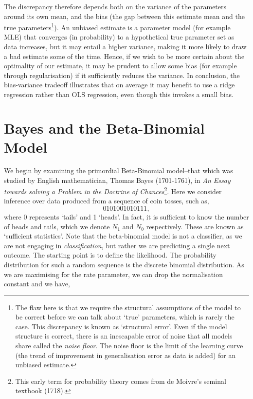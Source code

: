 \documentclass[11pt]{amsart}
\begin{document}
The discrepancy therefore depends both on the variance of the parameters around its own mean, and the bias (the gap between this estimate mean and the true parameters\footnote{The flaw here is that we require the structural assumptions of the model to be correct before we can talk about `true' parameters, which is rarely the case. This discrepancy is known as `structural error'. Even if the model structure is correct, there is an inescapable error of noise that all models share called the \emph{noise floor}. The noise floor is the limit of the learning curve (the trend of improvement in generalisation error as data is added) for an unbiased estimate.}). An unbiased estimate is a parameter model (for example MLE) that converges (in probability) to a hypothetical true parameter set as data increases, but it may entail a higher variance, making it more likely to draw a bad estimate some of the time. Hence, if we wish to be more certain about the optimality of our estimate, it may be prudent to allow some bias (for example through regularisation) if it sufficiently reduces the variance. In conclusion, the bias-variance tradeoff illustrates that on average it may benefit to use a ridge regression rather than OLS regression, even though this invokes a small bias.

\section{Bayes and the Beta-Binomial Model}

We begin by examining the primordial Beta-Binomial model--that which was studied by English mathematician, Thomas Bayes (1701-1761), in \emph{An Essay towards solving a Problem in the Doctrine of Chances}\footnote{This early term for probability theory comes from de Moivre's seminal textbook (1718).}. Here we consider inference over data produced from a sequence of coin tosses, such as, $$0101001010111,$$ where $0$ represents `tails' and 1 `heads'. In fact, it is sufficient to know the number of heads and tails, which we denote $N_1$ and $N_0$ respectively. These are known as `sufficient statistics'. Note that the beta-binomial model is not a classifier, as we are not engaging in \emph{classification}, but rather we are predicting a single next outcome. The starting point is to define the likelihood. The probability distribution for such a random sequence is the discrete binomial distribution. As we are maximising for the rate parameter, we can drop the normalisation constant and we have,
\end{document}
